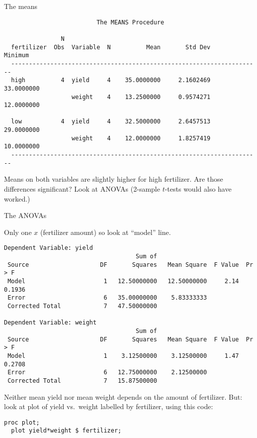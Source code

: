 \documentclass[pdf]{prosper}
\begin{document}
\begin{slide}{The means}

{\scriptsize
\begin{verbatim}
                          The MEANS Procedure

                N
  fertilizer  Obs  Variable  N          Mean       Std Dev       Minimum
  ----------------------------------------------------------------------
  high          4  yield     4    35.0000000     2.1602469    33.0000000
                   weight    4    13.2500000     0.9574271    12.0000000

  low           4  yield     4    32.5000000     2.6457513    29.0000000
                   weight    4    12.0000000     1.8257419    10.0000000
  ----------------------------------------------------------------------

\end{verbatim}
}

Means on both variables are slightly higher for high fertilizer. Are those differences significant? Look at ANOVAs (2-sample $t$-tests would also have worked.)
  
\end{slide}

\begin{slide}{The ANOVAs}

Only one $x$ (fertilizer amount) so look at ``model'' line.

{\scriptsize
\begin{verbatim}
Dependent Variable: yield   
                                     Sum of
 Source                    DF       Squares   Mean Square  F Value  Pr > F
 Model                      1   12.50000000   12.50000000     2.14  0.1936
 Error                      6   35.00000000    5.83333333                 
 Corrected Total            7   47.50000000                               

Dependent Variable: weight   
                                     Sum of
 Source                    DF       Squares   Mean Square  F Value  Pr > F
 Model                      1    3.12500000    3.12500000     1.47  0.2708
 Error                      6   12.75000000    2.12500000                 
 Corrected Total            7   15.87500000                               
\end{verbatim}
}

Neither mean yield nor mean weight depends on the amount of fertilizer. But: look at plot of yield vs.\ weight labelled by fertilizer, using this code:

\begin{verbatim}
proc plot;
  plot yield*weight $ fertilizer;
\end{verbatim}
  
\end{slide}
\end{document}
